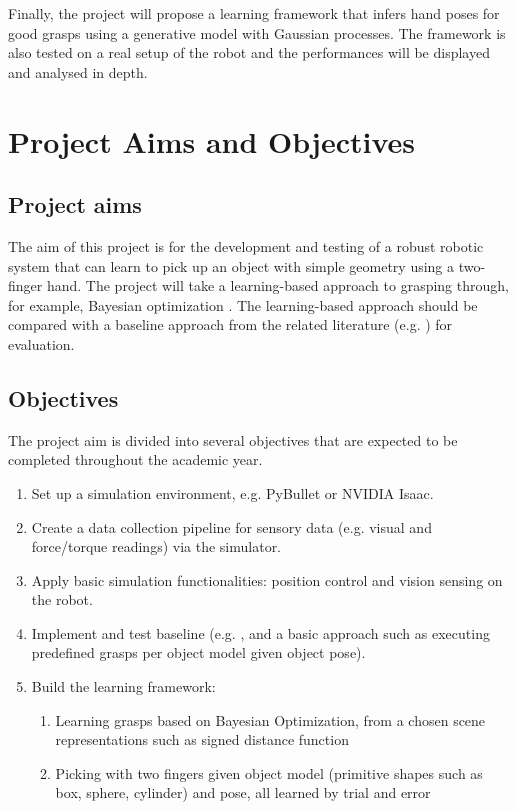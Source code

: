 \documentclass[11pt, a4paper]{report}
\theoremstyle{definition}
\begin{document}
Finally, the project will propose a learning framework that infers hand poses for good grasps using a generative model with Gaussian processes. The framework is also tested on a real setup of the robot and the performances will be displayed and analysed in depth.


\section{Project Aims and Objectives}
\label{sec:1.2}

\subsection{Project aims}
\label{sec:1.2.1}
The aim of this project is for the development and testing of a robust robotic system that can learn to pick up an object with simple geometry using a two-finger hand. The project will take a learning-based approach to grasping through, for example, Bayesian optimization \cite{nogueria, frazier}. The learning-based approach should be compared with a baseline approach from the related literature (e.g. \cite{nogueria, danielczuk, breyer}) for evaluation. 

\subsection{Objectives}
\label{sec:1.2.2}
The project aim is divided into several objectives that are expected to be completed throughout the academic year. 
\begin{enumerate}
    \item Set up a simulation environment, e.g. PyBullet or NVIDIA Isaac. 
    \item Create a data collection pipeline for sensory data (e.g. visual and force/torque readings) via the simulator.
    \item Apply basic simulation functionalities: position control and vision sensing on the robot.
    \item Implement and test baseline (e.g. \cite{breyer}, and a basic approach such as executing predefined grasps per object model given object pose).
    \item Build the learning framework:
    \begin{enumerate}
        \item Learning grasps based on Bayesian Optimization, from a chosen scene representations such as signed distance function 
        \item Picking with two fingers given object model (primitive shapes such as box, sphere, cylinder) and pose, all learned by trial and error
    \end{enumerate}
\end{enumerate}
\end{document}
